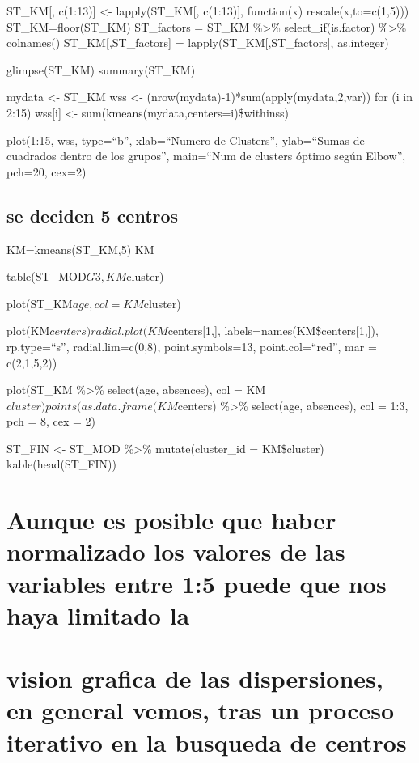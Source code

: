 \documentclass[]{article}
\begin{document}
ST\_KM{[}, c(1:13){]} \textless{}- lapply(ST\_KM{[}, c(1:13){]},
function(x) rescale(x,to=c(1,5))) ST\_KM=floor(ST\_KM) ST\_factors =
ST\_KM \%\textgreater{}\% select\_if(is.factor) \%\textgreater{}\%
colnames() ST\_KM{[},ST\_factors{]} = lapply(ST\_KM{[},ST\_factors{]},
as.integer)

glimpse(ST\_KM) summary(ST\_KM)

mydata \textless{}- ST\_KM wss \textless{}-
(nrow(mydata)-1)*sum(apply(mydata,2,var)) for (i in 2:15) wss{[}i{]}
\textless{}- sum(kmeans(mydata,centers=i)\$withinss)

plot(1:15, wss, type=``b'', xlab=``Numero de Clusters'', ylab=``Sumas de
cuadrados dentro de los grupos'', main=``Num de clusters óptimo según
Elbow'', pch=20, cex=2)

\subsection{se deciden 5 centros}\label{se-deciden-5-centros}

KM=kmeans(ST\_KM,5) KM

table(ST\_MOD\(G3, KM\)cluster)

plot(ST\_KM\(age, col=KM\)cluster)

plot(KM\(centers) radial.plot(KM\)centers{[}1,{]},
labels=names(KM\$centers{[}1,{]}), rp.type=``s'', radial.lim=c(0,8),
point.symbols=13, point.col=``red'', mar = c(2,1,5,2))

plot(ST\_KM \%\textgreater{}\% select(age, absences), col =
KM\(cluster) points(as.data.frame(KM\)centers) \%\textgreater{}\%
select(age, absences), col = 1:3, pch = 8, cex = 2)

ST\_FIN \textless{}- ST\_MOD \%\textgreater{}\% mutate(cluster\_id =
KM\$cluster) kable(head(ST\_FIN))

\section{Aunque es posible que haber normalizado los valores de las
variables entre 1:5 puede que nos haya limitado
la}\label{aunque-es-posible-que-haber-normalizado-los-valores-de-las-variables-entre-15-puede-que-nos-haya-limitado-la}

\section{vision grafica de las dispersiones, en general vemos, tras un
proceso iterativo en la busqueda de
centros}\label{vision-grafica-de-las-dispersiones-en-general-vemos-tras-un-proceso-iterativo-en-la-busqueda-de-centros}
\end{document}
